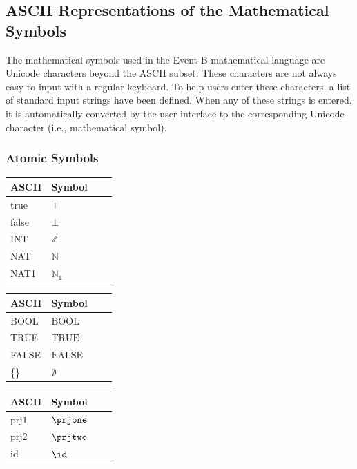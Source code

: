 \subsection{ASCII Representations of the Mathematical Symbols}
\label{ascii_representations_of_the_mathematical_symbols}


The mathematical symbols used in the Event-B mathematical language are Unicode characters beyond the ASCII subset. These characters are not always easy to input with a regular keyboard. To help users enter these characters, a list of standard input strings have been defined. When any of these strings is entered, it is automatically converted by the user interface to the corresponding Unicode character (i.e., mathematical symbol).

\subsubsection{Atomic Symbols}

\begin{center}
    \begin{tabular}{ | l | l | l | p{5cm} |}
    \hline
	ASCII & Symbol \\ \hline
	true & $\top$ \\ \hline
	false & $\bot$ \\ \hline
	INT & $\mathbb{Z}$ \\ \hline
	NAT & $\mathbb{N}$ \\ \hline
	NAT1 & $\mathbb{N_1}$ \\ \hline
    \end{tabular}
    \begin{tabular}{ | l | l | l | p{5cm} |}
    \hline
	ASCII & Symbol \\ \hline
	BOOL & $\mathrm{BOOL}$ \\ \hline
	TRUE & $\mathrm{TRUE}$ \\ \hline
	FALSE & $\mathrm{FALSE}$ \\ \hline
	\{\} & $\emptyset$ \\ \hline
    \end{tabular}
    \begin{tabular}{ | l | l | l | p{5cm} |}
    \hline
	ASCII & Symbol \\ \hline
	prj1 & $\prjone$ \\ \hline
	prj2 & $\prjtwo$ \\ \hline
	id & $\id$ \\ \hline
    \end{tabular}
\end{center}

